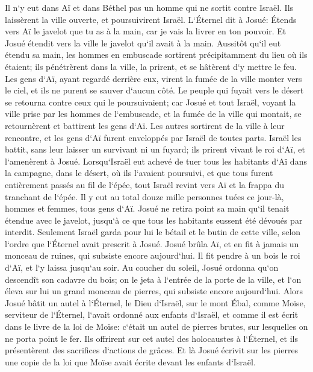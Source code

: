 \verse Il n`y eut dans Aï et dans Béthel pas un homme qui ne sortit contre Israël. Ils laissèrent la ville ouverte, et poursuivirent Israël. 
\verse L`Éternel dit à Josué: Étends vers Aï le javelot que tu as à la main, car je vais la livrer en ton pouvoir. Et Josué étendit vers la ville le javelot qu`il avait à la main. 
\verse Aussitôt qu`il eut étendu sa main, les hommes en embuscade sortirent précipitamment du lieu où ils étaient; ils pénétrèrent dans la ville, la prirent, et se hâtèrent d`y mettre le feu. 
\verse Les gens d`Aï, ayant regardé derrière eux, virent la fumée de la ville monter vers le ciel, et ils ne purent se sauver d`aucun côté. Le peuple qui fuyait vers le désert se retourna contre ceux qui le poursuivaient; 
\verse car Josué et tout Israël, voyant la ville prise par les hommes de l`embuscade, et la fumée de la ville qui montait, se retournèrent et battirent les gens d`Aï. 
\verse Les autres sortirent de la ville à leur rencontre, et les gens d`Aï furent enveloppés par Israël de toutes parts. Israël les battit, sans leur laisser un survivant ni un fuyard; 
\verse ils prirent vivant le roi d`Aï, et l`amenèrent à Josué. 
\verse Lorsqu`Israël eut achevé de tuer tous les habitants d`Aï dans la campagne, dans le désert, où ils l`avaient poursuivi, et que tous furent entièrement passés au fil de l`épée, tout Israël revint vers Aï et la frappa du tranchant de l`épée. 
\verse Il y eut au total douze mille personnes tuées ce jour-là, hommes et femmes, tous gens d`Aï. 
\verse Josué ne retira point sa main qu`il tenait étendue avec le javelot, jusqu`à ce que tous les habitants eussent été dévoués par interdit. 
\verse Seulement Israël garda pour lui le bétail et le butin de cette ville, selon l`ordre que l`Éternel avait prescrit à Josué. 
\verse Josué brûla Aï, et en fit à jamais un monceau de ruines, qui subsiste encore aujourd`hui. 
\verse Il fit pendre à un bois le roi d`Aï, et l`y laissa jusqu`au soir. Au coucher du soleil, Josué ordonna qu`on descendît son cadavre du bois; on le jeta à l`entrée de la porte de la ville, et l`on éleva sur lui un grand monceau de pierres, qui subsiste encore aujourd`hui. 
\verse Alors Josué bâtit un autel à l`Éternel, le Dieu d`Israël, sur le mont Ébal, 
\verse comme Moïse, serviteur de l`Éternel, l`avait ordonné aux enfants d`Israël, et comme il est écrit dans le livre de la loi de Moïse: c`était un autel de pierres brutes, sur lesquelles on ne porta point le fer. Ils offrirent sur cet autel des holocaustes à l`Éternel, et ils présentèrent des sacrifices d`actions de grâces. 
\verse Et là Josué écrivit sur les pierres une copie de la loi que Moïse avait écrite devant les enfants d`Israël. 
